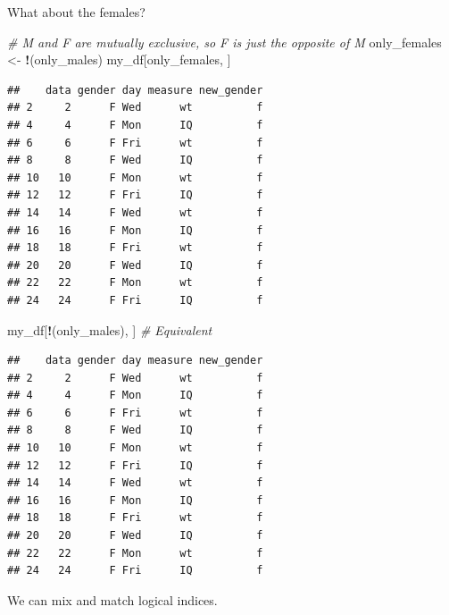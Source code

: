 \documentclass[]{article}
\newenvironment{Shaded}{\begin{snugshade}}{\end{snugshade}}
\newcommand{\StringTok}[1]{\textcolor[rgb]{0.31,0.60,0.02}{#1}}
\newcommand{\CommentTok}[1]{\textcolor[rgb]{0.56,0.35,0.01}{\textit{#1}}}
\newcommand{\OperatorTok}[1]{\textcolor[rgb]{0.81,0.36,0.00}{\textbf{#1}}}
\newcommand{\NormalTok}[1]{#1}
\begin{document}
What about the females?

\begin{Shaded}
\begin{Highlighting}[]
\CommentTok{# M and F are mutually exclusive, so F is just the opposite of M}
\NormalTok{only_females <-}\StringTok{ }\OperatorTok{!}\NormalTok{(only_males)}
\NormalTok{my_df[only_females, ]}
\end{Highlighting}
\end{Shaded}

\begin{verbatim}
##    data gender day measure new_gender
## 2     2      F Wed      wt          f
## 4     4      F Mon      IQ          f
## 6     6      F Fri      wt          f
## 8     8      F Wed      IQ          f
## 10   10      F Mon      wt          f
## 12   12      F Fri      IQ          f
## 14   14      F Wed      wt          f
## 16   16      F Mon      IQ          f
## 18   18      F Fri      wt          f
## 20   20      F Wed      IQ          f
## 22   22      F Mon      wt          f
## 24   24      F Fri      IQ          f
\end{verbatim}

\begin{Shaded}
\begin{Highlighting}[]
\NormalTok{my_df[}\OperatorTok{!}\NormalTok{(only_males), ]  }\CommentTok{# Equivalent}
\end{Highlighting}
\end{Shaded}

\begin{verbatim}
##    data gender day measure new_gender
## 2     2      F Wed      wt          f
## 4     4      F Mon      IQ          f
## 6     6      F Fri      wt          f
## 8     8      F Wed      IQ          f
## 10   10      F Mon      wt          f
## 12   12      F Fri      IQ          f
## 14   14      F Wed      wt          f
## 16   16      F Mon      IQ          f
## 18   18      F Fri      wt          f
## 20   20      F Wed      IQ          f
## 22   22      F Mon      wt          f
## 24   24      F Fri      IQ          f
\end{verbatim}

We can mix and match logical indices.

\begin{Shaded}
\end{Shaded}
\end{document}
